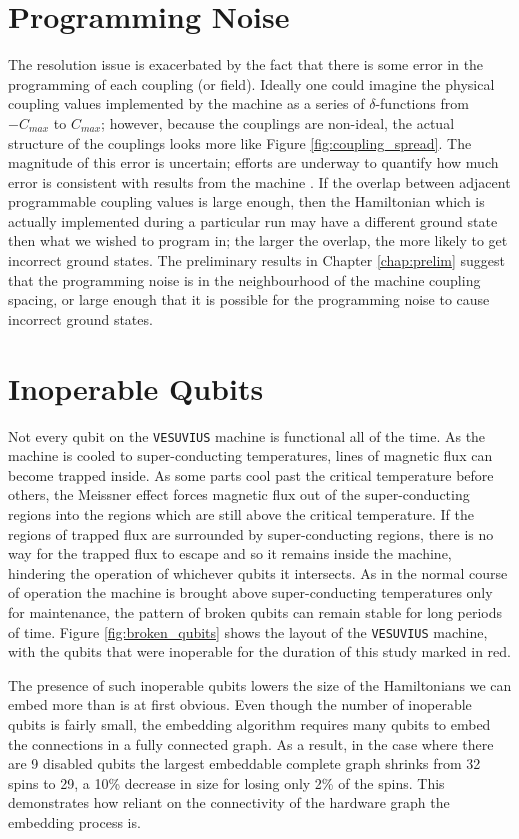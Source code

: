 \section{Programming Noise}
\label{sec:noise}
The resolution issue is exacerbated by the fact that there is some error in the programming of each coupling (or field).  Ideally one could imagine the physical coupling values implemented by the machine as a series of $\delta$-functions from $-C_{max}$ to $C_{max}$; however, because the couplings are non-ideal, the actual structure of the couplings looks more like Figure \ref{fig:coupling_spread}.  The magnitude of this error is uncertain; efforts are underway to quantify how much error is consistent with results from the machine \cite{aaron}.  If the overlap between adjacent programmable coupling values is large enough, then the Hamiltonian which is actually implemented during a particular run may have a different ground state then what we wished to program in; the larger the overlap, the more likely to get incorrect ground states.  The preliminary results in Chapter \ref{chap:prelim} suggest that the programming noise is in the neighbourhood of the machine coupling spacing, or large enough that it is possible for the programming noise to cause incorrect ground states.

\section{Inoperable Qubits}
Not every qubit on the \texttt{VESUVIUS} machine is functional all of the time.  As the machine is cooled to super-conducting temperatures, lines of magnetic flux can become trapped inside.  As some parts cool past the critical temperature before others, the Meissner effect forces magnetic flux out of the super-conducting regions into the regions which are still above the critical temperature.  If the regions of trapped flux are surrounded by super-conducting regions, there is no way for the trapped flux to escape and so it remains inside the machine, hindering the operation of whichever qubits it intersects.  As in the normal course of operation the machine is brought above super-conducting temperatures only for maintenance, the pattern of broken qubits can remain stable for long periods of time.  Figure \ref{fig:broken_qubits} shows the layout of the \texttt{VESUVIUS} machine, with the qubits that were inoperable for the duration of this study marked in red.

The presence of such inoperable qubits lowers the size of the Hamiltonians we can embed more than is at first obvious.  Even though the number of inoperable qubits is fairly small, the embedding algorithm requires many qubits to embed the connections in a fully connected graph.  As a result, in the case where there are 9 disabled qubits the largest embeddable complete graph shrinks from 32 spins to 29, a 10\% decrease in size for losing only 2\% of the spins.  This demonstrates how reliant on the connectivity of the hardware graph the embedding process is.

